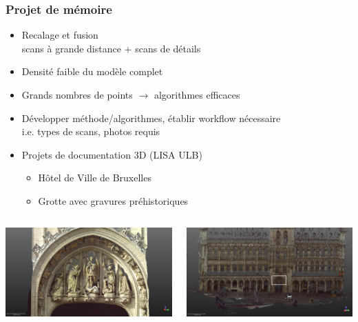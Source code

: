 \documentclass{beamer}
\begin{document}
\begin{frame}
\frametitle{Projet de mémoire}
	\begin{itemize}
	\item Recalage et fusion
		\\ scans à grande distance + scans de détails
	\item Densité faible du modèle complet
	\item Grands nombres de points $\rightarrow$ algorithmes efficaces
	\item Développer méthode/algorithmes, établir workflow nécessaire
		\\ i.e. types de scans, photos requis
	\item Projets de documentation 3D (LISA ULB)
		\begin{itemize}
		\item Hôtel de Ville de Bruxelles
		\item Grotte avec gravures préhistoriques
		\end{itemize}
	\end{itemize}
	\begin{columns}
		\begin{column}[T]{.5\textwidth}
			\includegraphics[width=\textwidth]{HotelDeVille_08.png}
		\end{column}
		\begin{column}[T]{.5\textwidth}
			\includegraphics[width=\textwidth]{HotelDeVille_06rect.png}
		\end{column}
	\end{columns}
\end{frame}
\end{document}

